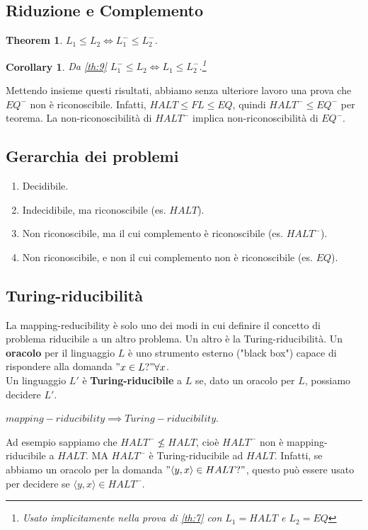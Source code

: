 \documentclass[a4paper, 12pt]{article}
\newtheorem{theorem}{Theorem}[section]
\newtheorem{corollary}{Corollary}[theorem]
\begin{document}
\subsection{Riduzione e Complemento}
\begin{theorem}
\label{th:10}
$L_1 \leq L_2 \iff L_{1}^{-} \leq L_{2}^{-}$.
\end{theorem}
\begin{corollary}
Da \ref{th:9} $L_{1}^{-} \leq L_2 \iff L_1 \leq L_{2}^{-}$.\footnote{Usato implicitamente nella prova di \ref{th:7} con $L_1 = HALT$ e $L_2= EQ$}
\end{corollary}
Mettendo insieme questi risultati, abbiamo senza ulteriore lavoro una prova che $EQ^{-}$ non \`e riconoscibile. Infatti, $HALT \leq FL \leq EQ$, quindi $HALT^{-} \leq EQ^{-}$ per teorema. La non-riconoscibilit\`a di $HALT^{-}$ implica non-riconoscibilit\`a di $EQ^{-}$.
\subsection{Gerarchia dei problemi}
\begin{enumerate}
\item Decidibile.
\item Indecidibile, ma riconoscibile (es. $HALT$).
\item Non riconoscibile, ma il cui complemento \`e riconoscibile (es. $HALT^{-}$).
\item Non riconoscibile, e non il cui complemento non \`e riconoscibile (es. $EQ$).
\end{enumerate}
\subsection{Turing-riducibilit\`a}
La mapping-reducibility è solo uno dei modi in cui definire il concetto di problema riducibile a un altro problema. Un altro \`e la Turing-riducibilit\`a. Un \textbf{oracolo} per il linguaggio $L$ \`e uno strumento esterno ("black box") capace di rispondere alla domanda $"x \in L?" \forall x$.\\ Un linguaggio $L'$ \`e \textbf{Turing-riducibile} a $L$ se, dato un oracolo per $L$, possiamo decidere $L'$.
\begin{center}
$mapping-riducibility \implies Turing-riducibility$.
\end{center}
Ad esempio sappiamo che $HALT^{-} \nleq HALT$, cio\`e $HALT^{-}$ non \`e mapping-riducibile a $HALT$. MA $HALT^{-}$ \`e Turing-riducibile ad $HALT$. Infatti, se abbiamo un oracolo per la domanda $"\langle y,x \rangle \in HALT?"$, questo pu\`o essere usato per decidere se $\langle y,x \rangle \in HALT^{-}$.
\newpage
\end{document}
